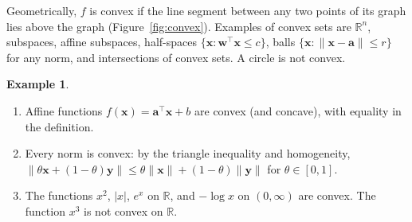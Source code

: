 \documentclass[11pt]{article}
\newcommand{\norm}[1]{\lVert #1 \rVert}
\theoremstyle{definition}
\newtheorem{example}[definition]{Example}
\theoremstyle{plain}
\theoremstyle{remark}
\begin{document}
Geometrically, $f$ is convex if the line segment between any two points of its graph lies above the graph (Figure~\ref{fig:convex}). Examples of convex sets are $\mathbb{R}^n$, subspaces, affine subspaces, half-spaces $\{\mathbf{x} : \mathbf{w}^\top\mathbf{x} \leq c\}$, balls $\{\mathbf{x} : \norm{\mathbf{x} - \mathbf{a}} \leq r\}$ for any norm, and intersections of convex sets. A circle is not convex.

\begin{example}\label{ex:convex-functions}
    \begin{enumerate}
        \item Affine functions $f(\mathbf{x}) = \mathbf{a}^\top\mathbf{x} + b$ are convex (and concave), with equality in the definition.
        \item Every norm is convex: by the triangle inequality and homogeneity, $\norm{\theta\mathbf{x} + (1 - \theta)\mathbf{y}} \leq \theta\norm{\mathbf{x}} + (1 - \theta)\norm{\mathbf{y}}$ for $\theta \in [0, 1]$.
        \item The functions $x^2$, $|x|$, $e^x$ on $\mathbb{R}$, and $-\log x$ on $(0, \infty)$ are convex. The function $x^3$ is not convex on $\mathbb{R}$.
    \end{enumerate}
\end{example}
\end{document}
